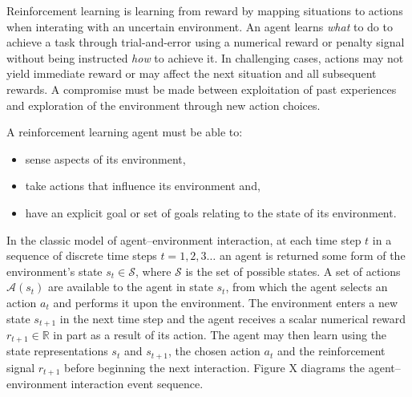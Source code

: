 
Reinforcement learning is learning from reward by mapping situations to actions
when interating with an uncertain environment.  An agent learns \textit{what}
to do to achieve a task through trial-and-error using a numerical reward or
penalty signal without being instructed \textit{how} to achieve it.  In
challenging cases, actions may not yield immediate reward or may affect the
next situation and all subsequent rewards.  A compromise must be made between
exploitation of past experiences and exploration of the environment through new
action choices.

A reinforcement learning agent must be able to:
\begin{itemize}
  \item sense aspects of its environment,
  \item take actions that influence its environment and,
  \item have an explicit goal or set of goals relating to the state of its
  environment.
\end{itemize}
In the classic model of agent--environment interaction, at each time step $t$
in a sequence of discrete time steps $t = 1,2,3\dotsc$ an agent is returned
some form of the environment's state $s_t \in \mathcal{S}$, where $\mathcal{S}$
is the set of possible states.  A set of actions $\mathcal{A}(s_t)$ are
available to the agent in state $s_t$, from which the agent selects an action
$a_t$ and performs it upon the environment.  The environment enters a new state
$s_{t+1}$ in the next time step and the agent receives a scalar numerical
reward $r_{t+1} \in \mathbb{R}$ in part as a result of its action.  The agent
may then learn using the state representations $s_t$ and $s_{t+1}$, the chosen
action $a_t$ and the reinforcement signal $r_{t+1}$ before beginning the next
interaction.  Figure X diagrams the agent--environment interaction event
sequence.

